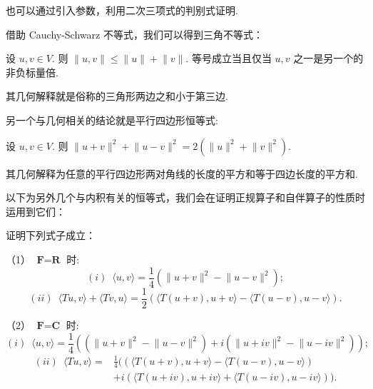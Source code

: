也可以通过引入参数，利用二次三项式的判别式证明. 

\vspace{2ex}

借助 Cauchy-Schwarz 不等式，我们可以得到三角不等式：

\begin{theorem}
    设 $u, v \in V$. 则 $\lVert u, v \rVert \leqslant \lVert u \rVert + \lVert v \rVert$.
    等号成立当且仅当 $u, v$ 之一是另一个的非负标量倍.
\end{theorem}

其几何解释就是俗称的三角形两边之和小于第三边. 

\vspace{2ex}

另一个与几何相关的结论就是平行四边形恒等式:

\begin{theorem}
    设 $u, v \in V$. 则 $ \lVert u + v \rVert^{2} + \lVert u - v \rVert^{2} = 2(\lVert u \rVert^{2} + \lVert v \rVert^{2})$.
\end{theorem}

其几何解释为任意的平行四边形两对角线的长度的平方和等于四边长度的平方和. 

\vspace{2ex}


以下为另外几个与内积有关的恒等式，我们会在证明正规算子和自伴算子的性质时运用到它们：

\begin{example}
    证明下列式子成立：

    \textup{（1）} $\textbf{F} = \textbf{R}$ 时:
    \[(i) \enspace \langle u, v\rangle  = \frac{1}{4}\left( \lVert u + v \rVert^2 - \lVert u - v \rVert^2\right);\]
    \[(ii) \enspace \langle Tu, v\rangle + \langle Tv, u\rangle = 
    \frac{1}{2}\left(\langle T(u + v), u + v\rangle - \langle T(u - v), u - v\rangle\right).\]

    \textup{（2）} $\textbf{F} = \textbf{C}$ 时:
    \[(i) \enspace \langle u, v\rangle  = \frac{1}{4}\left( (\lVert u + v \rVert^2 - \lVert u - v \rVert^2) + i(\lVert u + iv \rVert^2 - \lVert u - iv \rVert^2) \right);\]
    \begin{align*}
        (ii) \enspace \langle Tu, v\rangle = & \frac{1}{4}  ((\langle T(u + v), u + v\rangle - \langle T(u - v), u - v\rangle) \\ 
                                             & + i(\langle T(u + iv), u + iv\rangle + \langle T(u - iv), u - iv\rangle)).
    \end{align*}

\end{example}


